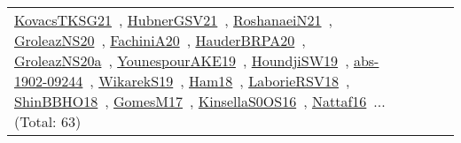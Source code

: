 {\begin{longtable}{lp{3cm}>{\raggedright\arraybackslash}p{6cm}>{\raggedright\arraybackslash}p{6cm}>{\raggedright\arraybackslash}p{8cm}}
\href{../works/KovacsTKSG21.pdf}{KovacsTKSG21}~\cite{KovacsTKSG21}, \href{../works/HubnerGSV21.pdf}{HubnerGSV21}~\cite{HubnerGSV21}, \href{../works/RoshanaeiN21.pdf}{RoshanaeiN21}~\cite{RoshanaeiN21}, \href{../works/GroleazNS20.pdf}{GroleazNS20}~\cite{GroleazNS20}, \href{../works/FachiniA20.pdf}{FachiniA20}~\cite{FachiniA20}, \href{../works/HauderBRPA20.pdf}{HauderBRPA20}~\cite{HauderBRPA20}, \href{../works/GroleazNS20a.pdf}{GroleazNS20a}~\cite{GroleazNS20a}, \href{../works/YounespourAKE19.pdf}{YounespourAKE19}~\cite{YounespourAKE19}, \href{../works/HoundjiSW19.pdf}{HoundjiSW19}~\cite{HoundjiSW19}, \href{../works/abs-1902-09244.pdf}{abs-1902-09244}~\cite{abs-1902-09244}, \href{../works/WikarekS19.pdf}{WikarekS19}~\cite{WikarekS19}, \href{../works/Ham18.pdf}{Ham18}~\cite{Ham18}, \href{../works/LaborieRSV18.pdf}{LaborieRSV18}~\cite{LaborieRSV18}, \href{../works/ShinBBHO18.pdf}{ShinBBHO18}~\cite{ShinBBHO18}, \href{../works/GomesM17.pdf}{GomesM17}~\cite{GomesM17}, \href{../works/KinsellaS0OS16.pdf}{KinsellaS0OS16}~\cite{KinsellaS0OS16}, \href{../works/Nattaf16.pdf}{Nattaf16}~\cite{Nattaf16}... (Total: 63)\\

\end{longtable}}
